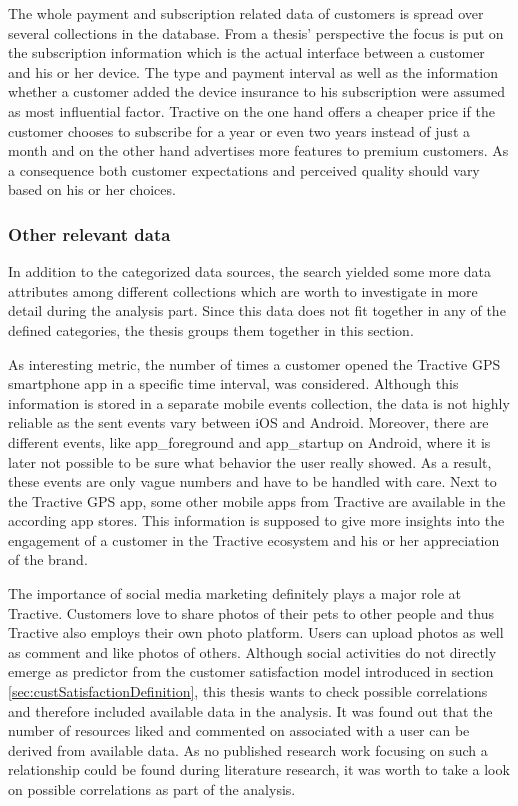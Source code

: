 The whole payment and subscription related data of customers is spread over several collections in the database. From a thesis' perspective the focus is put on the subscription information which is the actual interface between a customer and his or her device. The type and payment interval as well as the information whether a customer added the device insurance to his subscription were assumed as most influential factor. Tractive on the one hand offers a cheaper price if the customer chooses to subscribe for a year or even two years instead of just a month and on the other hand advertises more features to premium customers. As a consequence both customer expectations and perceived quality should vary based on his or her choices.

\subsubsection{Other relevant data}
In addition to the categorized data sources, the search yielded some more data attributes among different collections which are worth to investigate in more detail during the analysis part. Since this data does not fit together in any of the defined categories, the thesis groups them together in this section. 

As interesting metric, the number of times a customer opened the Tractive GPS smartphone app in a specific time interval, was considered. Although this information is stored in a separate mobile events collection, the data is not highly reliable as the sent events vary between iOS and Android. Moreover, there are different events, like app\_foreground and app\_startup on Android, where it is later not possible to be sure what behavior the user really showed. As a result, these events are only vague numbers and have to be handled with care. Next to the Tractive GPS app, some other mobile apps from Tractive are available in the according app stores. This information is supposed to give more insights into the engagement of a customer in the Tractive ecosystem and his or her appreciation of the brand. 

The importance of social media marketing definitely plays a major role at Tractive. Customers love to share photos of their pets to other people and thus Tractive also employs their own photo platform. Users can upload photos as well as comment and like photos of others. Although social activities do not directly emerge as predictor from the customer satisfaction model introduced in section \ref{sec:custSatisfactionDefinition}, this thesis wants to check possible correlations and therefore included available data in the analysis. It was found out that the number of resources liked and commented on associated with a user can be derived from available data. As no published research work focusing on such a relationship could be found during literature research, it was worth to take a look on possible correlations as part of the analysis. 

